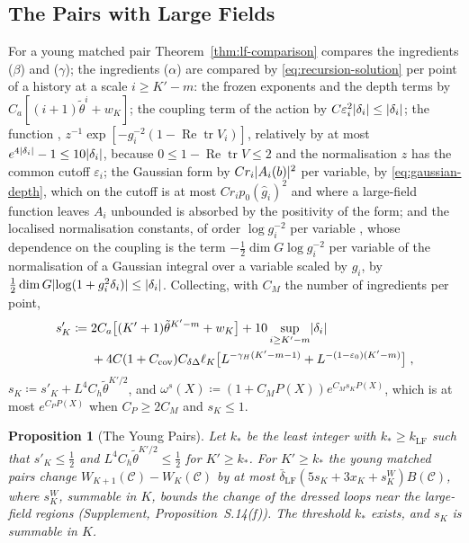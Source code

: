 \documentclass[11pt]{preprint}
\newcommand{\tr}{\operatorname{tr}}
\DeclarePairedDelimiter{\abs}{\lvert}{\rvert}
\numberwithin{equation}{section}
\newtheorem{proposition}[theorem]{Proposition}
\theoremstyle{definition}
\theoremstyle{remark}
\theoremstyle{plain}
\begin{document}
\subsection{The Pairs with Large Fields}\label{sec:large-field-pairs}

For a young matched pair Theorem~\ref{thm:lf-comparison} compares the ingredients ($\beta$) and ($\gamma$); the ingredients ($\alpha$) are compared by \eqref{eq:recursion-solution} per point of a history at a scale $i \geq K' - m$: the frozen exponents and the depth terms by $C_a[(i + 1)\tilde\theta^i + w_K]$; the coupling term of the action by $C\varepsilon_i^2\abs{\delta_i} \leq \abs{\delta_i}$; the function \cite[(1.6), p.~178]{BalabanLFR1}, $z^{-1}\exp[-g_i^{-2}(1 - \operatorname{Re}\tr V_i)]$, relatively by at most $e^{4\abs{\delta_i}} - 1 \leq 10\abs{\delta_i}$, because $0 \leq 1 - \operatorname{Re}\tr V \leq 2$ and the normalisation $z$ has the common cutoff $\varepsilon_i$; the Gaussian form by $Cr_i\abs{A_i(b)}^2$ per variable, by \eqref{eq:gaussian-depth}, which on the cutoff is at most $Cr_ip_0(\hat g_i)^2$ and where a large-field function leaves $A_i$ unbounded is absorbed by the positivity of the form; and the localised normalisation constants, of order $\log g_i^{-2}$ per variable \cite[p.~380]{BalabanLFR2}, whose dependence on the coupling is the term $-\frac12\dim G\log g_i^{-2}$ per variable of the normalisation of a Gaussian integral over a variable scaled by $g_i$, by $\frac12\dim G\abs{\log(1 + g_i^2\delta_i)} \leq \abs{\delta_i}$. Collecting, with $C_M$ the number of ingredients per point,
\begin{equation}\label{eq:s-k}
\begin{aligned}
    s'_K \coloneqq{}& 2C_a\bigl[(K' + 1)\tilde\theta^{K'-m} + w_K\bigr] + 10\sup_{i \geq K'-m}\abs{\delta_i}\\
    &+ 4C(1 + C_{\mathrm{cov}})C_{\delta\Delta}\ell_K\bigl[L^{-\gamma_H(K'-m-1)} + L^{-(1-\varepsilon_0)(K'-m)}\bigr]\;,
\end{aligned}
\end{equation}
$s_K \coloneqq s'_K + L^4C_h\tilde\theta^{K'/2}$, and $\omega^s(X) \coloneqq (1 + C_MP(X))e^{C_Ms_KP(X)}$, which is at most $e^{C_PP(X)}$ when $C_P \geq 2C_M$ and $s_K \leq 1$.

\begin{proposition}[The Young Pairs]\label{prop:young-pairs}
Let $k_*$ be the least integer with $k_* \geq k_{\mathrm{LF}}$ such that $s'_K \leq \frac12$ and $L^4C_h\tilde\theta^{K'/2} \leq \frac12$ for $K' \geq k_*$. For $K' \geq k_*$ the young matched pairs change $W_{K+1}(\mathcal C) - W_K(\mathcal C)$ by at most $\bar\delta_{\mathrm{LF}}(5s_K + 3x_K + s^{W}_K)B(\mathcal C)$, where $s^W_K$, summable in $K$, bounds the change of the dressed loops near the large-field regions (Supplement, Proposition~S.14(f)). The threshold $k_*$ exists, and $s_K$ is summable in $K$.
\end{proposition}
\end{document}
